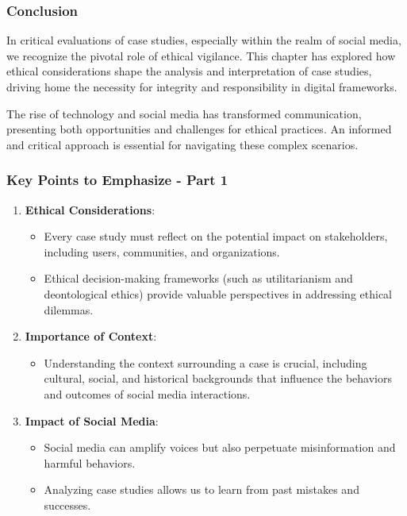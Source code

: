 \documentclass{beamer}
\begin{document}
\begin{frame}[fragile]
    \frametitle{Conclusion}
    In critical evaluations of case studies, especially within the realm of social media, we recognize the pivotal role of ethical vigilance. This chapter has explored how ethical considerations shape the analysis and interpretation of case studies, driving home the necessity for integrity and responsibility in digital frameworks. 

    The rise of technology and social media has transformed communication, presenting both opportunities and challenges for ethical practices. An informed and critical approach is essential for navigating these complex scenarios.
\end{frame}

\begin{frame}[fragile]
    \frametitle{Key Points to Emphasize - Part 1}
    \begin{enumerate}
        \item \textbf{Ethical Considerations}:
            \begin{itemize}
                \item Every case study must reflect on the potential impact on stakeholders, including users, communities, and organizations.
                \item Ethical decision-making frameworks (such as utilitarianism and deontological ethics) provide valuable perspectives in addressing ethical dilemmas.
            \end{itemize}
        
        \item \textbf{Importance of Context}:
            \begin{itemize}
                \item Understanding the context surrounding a case is crucial, including cultural, social, and historical backgrounds that influence the behaviors and outcomes of social media interactions.
            \end{itemize}
        
        \item \textbf{Impact of Social Media}:
            \begin{itemize}
                \item Social media can amplify voices but also perpetuate misinformation and harmful behaviors. 
                \item Analyzing case studies allows us to learn from past mistakes and successes.
            \end{itemize}
    \end{enumerate}
\end{frame}
\end{document}
